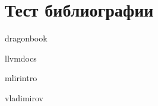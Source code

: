 \newpage
\section*{Тест библиографии}

dragonbook ~\cite{dragon_book}

llvmdocs ~\cite{llvm_docs}

mlirintro ~\cite{mlir_intro}

vladimirov ~\cite{vladimirov}
